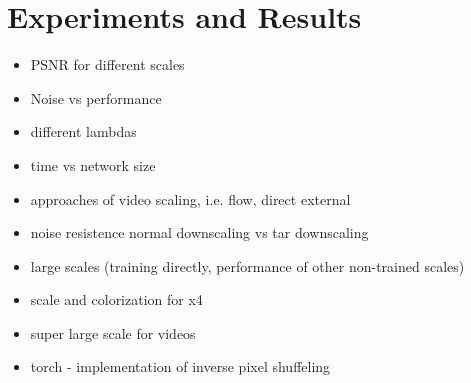 \newpage
\section{Experiments and Results}
\label{sec:ExperimentsandResults}



\begin{itemize}
  \item PSNR for different scales
  \item Noise vs performance
  \item different lambdas
  \item time vs network size
  \item approaches of video scaling, i.e. flow, direct external
  \item noise resistence normal downscaling vs tar downscaling
  \item large scales (training directly, performance of other non-trained scales)
  \item scale and colorization for x4
  \item super large scale for videos
\end{itemize}


\begin{itemize}
  \item torch - implementation of inverse pixel shuffeling
\end{itemize}

